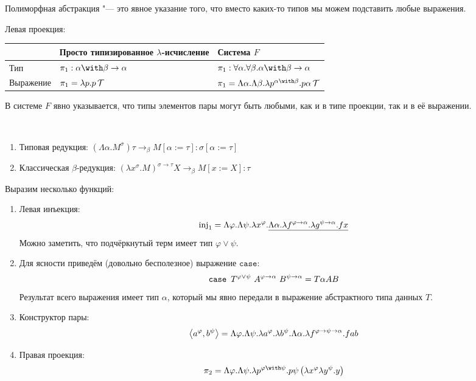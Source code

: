 Полиморфная абстракция "--- это явное указание того, что вместо каких-то типов мы можем подставить любые выражения.

\begin{example} Левая проекция:
    \begin{center}
    \begin{tabular}{l l l} \toprule
        & Просто типизированное $\lambda$-исчисление & Система $F$ \\ \midrule
        Тип & $\pi_1:\alpha\with\beta\to\alpha$ & $\pi_1:\forall \alpha . \forall \beta . \alpha \with \beta \to \alpha$ \\
        Выражение & $\pi_1 = \lambda p . p \operatorname{\mathcal{T}}$ & $\pi_1 = \Lambda \alpha . \Lambda \beta . \lambda p^{\alpha\with\beta} .
                p \alpha \comb T$
        \\ \bottomrule
    \end{tabular}
    \end{center}
В системе $F$ явно указывается, что типы элементов пары могут быть любыми, как и в типе проекции, так и в её выражении.
\end{example}

\begin{definition} \ 
    \begin{enumerate}
        \item Типовая редукция: $\left(\Lambda \alpha . M^\sigma\right) \tau \to_\beta M[\alpha:=\tau] : \sigma[\alpha := \tau]$
        \item Классическая $\beta$-редукция: $\left(\lambda x^\sigma.M\right)^{\sigma\to\tau} X \to_\beta M [x:=X] : \tau$
    \end{enumerate}
\end{definition}

Выразим несколько функций:
\begin{enumerate}
    \item Левая инъекция:
    \[
        \operatorname{inj}_1 = \Lambda \varphi . \Lambda \psi . \lambda x^\varphi .
            \underline{\Lambda \alpha . \lambda f^{\varphi\to\alpha}.\lambda g^{\psi\to\alpha}.f x}
    \]
    Можно заметить, что подчёркнутый терм имеет тип $\varphi \vee \psi$.
    \item Для ясности приведём (довольно бесполезное) выражение $\mathtt{case}$:
    \[
        \mathinner{\mathtt{case}}~T^{\varphi\vee\psi}~A^{\varphi\to\alpha}~B^{\psi\to\alpha} = T \alpha A B
    \]
    Результат всего выражения имеет тип $\alpha$, который мы явно передали в выражение абстрактного типа данных $T$.
    \item Конструктор пары:
    \[
        \left<a^\varphi, b^\psi\right> = \Lambda \varphi . \Lambda \psi . \lambda a^\varphi . \lambda b^\psi .
            \Lambda \alpha . \lambda f^{\varphi\to\psi\to\alpha} . f a b
    \]
    \item Правая проекция:
    \[
        \pi_2 = \Lambda \varphi . \Lambda \psi . \lambda p^{\varphi \with \psi}.p\psi\left(\lambda x^\varphi\lambda y^\psi.y\right)
    \]
\end{enumerate}

